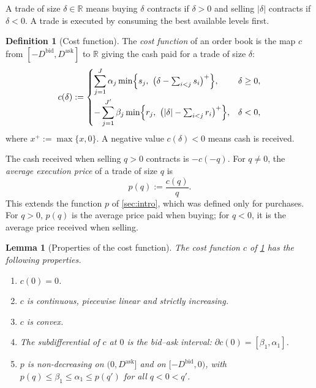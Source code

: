 \documentclass[11pt,a4paper]{article}
\theoremstyle{plain}
\newtheorem{lemma}[theorem]{Lemma}
\theoremstyle{definition}
\newtheorem{definition}[theorem]{Definition}
\theoremstyle{remark}
\newcommand{\1}{\mathbf{1}}
\newcommand{\R}{\mathbb{R}}
\begin{document}
A trade of size $\delta\in\R$ means buying $\delta$ contracts if $\delta>0$ and selling $|\delta|$ contracts if $\delta<0$. A trade is executed by consuming the best available levels first.

\begin{definition}[Cost function]
\label{def:cost}
The \emph{cost function} of an order book is the map $c$ from $[-D^{\mathrm{bid}},D^{\mathrm{ask}}]$ to $\R$ giving the cash paid for a trade of size $\delta$:
\[
c(\delta) :=
\begin{cases}
\displaystyle\sum_{j=1}^{J} \alpha_j \min\Bigl\{s_j,\ \bigl(\delta - \textstyle\sum_{i<j}s_i\bigr)^+\Bigr\}, & \delta\geq 0,\\[3ex]
\displaystyle-\sum_{j=1}^{J'} \beta_j \min\Bigl\{r_j,\ \bigl(|\delta| - \textstyle\sum_{i<j}r_i\bigr)^+\Bigr\}, & \delta<0,
\end{cases}
\]
where $x^+ := \max\{x,0\}$. A negative value $c(\delta)<0$ means cash is received.
\end{definition}

The cash received when selling $q>0$ contracts is $-c(-q)$. For $q\neq 0$, the \emph{average execution price} of a trade of size $q$ is
\[
p(q) := \frac{c(q)}{q}.
\]
This extends the function $p$ of \cref{sec:intro}, which was defined only for purchases. For $q>0$, $p(q)$ is the average price paid when buying; for $q<0$, it is the average price received when selling.

\begin{lemma}[Properties of the cost function]
\label{lem:cost}
The cost function $c$ of \cref{def:cost} has the following properties.
\begin{enumerate}[label=(\alph*)]
  \item $c(0)=0$.
  \item $c$ is continuous, piecewise linear and strictly increasing.
  \item $c$ is convex.
  \item The subdifferential of $c$ at $0$ is the bid--ask interval: $\partial c(0) = [\beta_1,\alpha_1]$.
  \item $p$ is non-decreasing on $(0,D^{\mathrm{ask}}]$ and on $[-D^{\mathrm{bid}},0)$, with $p(q)\leq\beta_1\leq\alpha_1\leq p(q')$ for all $q<0<q'$.
\end{enumerate}
\end{lemma}
\end{document}
